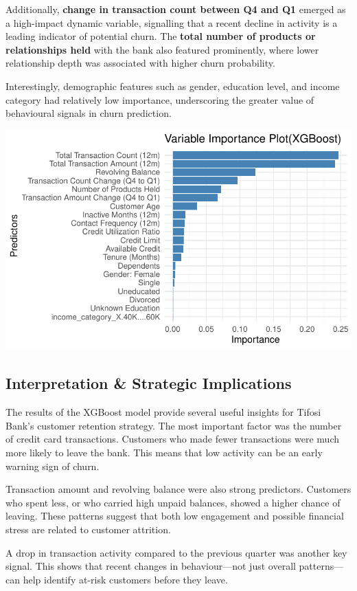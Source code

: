 \documentclass[
  letterpaper,
  DIV=11,
  numbers=noendperiod]{scrartcl}
\begin{document}
Additionally, \textbf{change in transaction count between Q4 and Q1}
emerged as a high-impact dynamic variable, signalling that a recent
decline in activity is a leading indicator of potential churn. The
\textbf{total number of products or relationships held} with the bank
also featured prominently, where lower relationship depth was associated
with higher churn probability.

Interestingly, demographic features such as gender, education level, and
income category had relatively low importance, underscoring the greater
value of behavioural signals in churn prediction.

\includegraphics{v4_files/figure-pdf/unnamed-chunk-20-1.pdf}

\subsection{Interpretation \& Strategic
Implications}\label{interpretation-strategic-implications}

The results of the XGBoost model provide several useful insights for
Tifosi Bank's customer retention strategy. The most important factor was
the number of credit card transactions. Customers who made fewer
transactions were much more likely to leave the bank. This means that
low activity can be an early warning sign of churn.

Transaction amount and revolving balance were also strong predictors.
Customers who spent less, or who carried high unpaid balances, showed a
higher chance of leaving. These patterns suggest that both low
engagement and possible financial stress are related to customer
attrition.

A drop in transaction activity compared to the previous quarter was
another key signal. This shows that recent changes in behaviour---not
just overall patterns---can help identify at-risk customers before they
leave.
\end{document}
